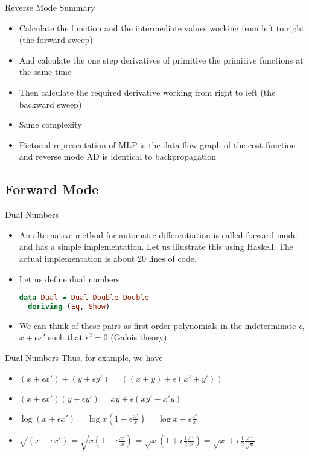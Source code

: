 \documentclass{beamer}
\begin{document}
\begin{frame}[fragile]{Reverse Mode Summary}

\begin{itemize}
\pause
\item Calculate the function and the intermediate values working from
  left to right (the forward sweep)
\pause
\item And calculate the one step derivatives of primitive the
  primitive functions at the same time
\pause
\item Then calculate the required derivative working from right to
  left (the backward sweep)
\pause
\item Same complexity
\pause
\item Pictorial representation of MLP is the data flow graph of the cost
  function and reverse mode AD is identical to backpropagation
\end{itemize}

\end{frame}

\subsection{Forward Mode}

\begin{frame}[fragile]{Dual Numbers}
\begin{itemize}
\item
An alternative method for automatic differentiation is called forward
mode and has a simple implementation. Let us illustrate this using
Haskell. The actual implementation is about 20 lines of code.
\pause
\item
Let us define dual numbers

\begin{lstlisting}[language=Haskell]
data Dual = Dual Double Double
  deriving (Eq, Show)
\end{lstlisting}
\pause
\item
We can think of these pairs as first order polynomials in the
indeterminate $\epsilon$, $x + \epsilon x'$ such that $\epsilon^2 = 0$
(Galois theory)
\end{itemize}
\end{frame}

\begin{frame}[fragile]{Dual Numbers}
Thus, for example, we have

\begin{itemize}
\pause
\item $(x + \epsilon x') + (y + \epsilon y') = ((x + y) + \epsilon (x' + y'))$
\pause
\item $(x + \epsilon x')(y + \epsilon y') = xy + \epsilon (xy' + x'y)$
\pause
\item $\log (x + \epsilon x') = \log x (1 + \epsilon \frac {x'}{x}) =
  \log x + \epsilon\frac{x'}{x}$
\pause
\item $\sqrt{(x + \epsilon x')} = \sqrt{x(1 + \epsilon\frac{x'}{x})} =
  \sqrt{x}(1 + \epsilon\frac{1}{2}\frac{x'}{x}) = \sqrt{x} +
  \epsilon\frac{1}{2}\frac{x'}{\sqrt{x}}$
\end{itemize}
\end{frame}
\end{document}
